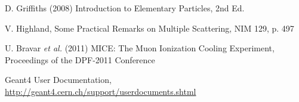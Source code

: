 \documentclass[a4paper,11pt]{article}
\begin{document}
\begin{thebibliography}{9}
D. Griffiths (2008) Introduction to Elementary Particles, 2nd Ed. 

V. Highland, Some Practical Remarks on Multiple Scattering, NIM 129, p. 497

U. Bravar \emph{et al.} (2011) MICE: The Muon Ionization Cooling Experiment, Proceedings of the DPF-2011 Conference

Geant4 User Documentation, \url{http://geant4.cern.ch/support/userdocuments.shtml}










\end{thebibliography}
\end{document}
